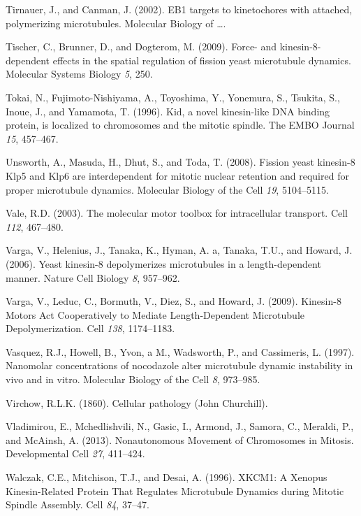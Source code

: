 \documentclass[12pt,a4paper,twoside,openright]{book}
\begin{document}
\hypertarget{ref-Tirnauer2002}{}
Tirnauer, J., and Canman, J. (2002). EB1 targets to kinetochores with
attached, polymerizing microtubules. Molecular Biology of \ldots{}.

\hypertarget{ref-Tischer2009}{}
Tischer, C., Brunner, D., and Dogterom, M. (2009). Force- and
kinesin-8-dependent effects in the spatial regulation of fission yeast
microtubule dynamics. Molecular Systems Biology \emph{5}, 250.

\hypertarget{ref-Tokai1996a}{}
Tokai, N., Fujimoto-Nishiyama, A., Toyoshima, Y., Yonemura, S., Tsukita,
S., Inoue, J., and Yamamota, T. (1996). Kid, a novel kinesin-like DNA
binding protein, is localized to chromosomes and the mitotic spindle.
The EMBO Journal \emph{15}, 457--467.

\hypertarget{ref-Unsworth2008}{}
Unsworth, A., Masuda, H., Dhut, S., and Toda, T. (2008). Fission yeast
kinesin-8 Klp5 and Klp6 are interdependent for mitotic nuclear retention
and required for proper microtubule dynamics. Molecular Biology of the
Cell \emph{19}, 5104--5115.

\hypertarget{ref-Vale2003}{}
Vale, R.D. (2003). The molecular motor toolbox for intracellular
transport. Cell \emph{112}, 467--480.

\hypertarget{ref-Varga2006}{}
Varga, V., Helenius, J., Tanaka, K., Hyman, A. a, Tanaka, T.U., and
Howard, J. (2006). Yeast kinesin-8 depolymerizes microtubules in a
length-dependent manner. Nature Cell Biology \emph{8}, 957--962.

\hypertarget{ref-Varga2009}{}
Varga, V., Leduc, C., Bormuth, V., Diez, S., and Howard, J. (2009).
Kinesin-8 Motors Act Cooperatively to Mediate Length-Dependent
Microtubule Depolymerization. Cell \emph{138}, 1174--1183.

\hypertarget{ref-Vasquez1997}{}
Vasquez, R.J., Howell, B., Yvon, a M., Wadsworth, P., and Cassimeris, L.
(1997). Nanomolar concentrations of nocodazole alter microtubule dynamic
instability in vivo and in vitro. Molecular Biology of the Cell
\emph{8}, 973--985.

\hypertarget{ref-virchow1860cellular}{}
Virchow, R.L.K. (1860). Cellular pathology (John Churchill).

\hypertarget{ref-Vladimirou2013}{}
Vladimirou, E., Mchedlishvili, N., Gasic, I., Armond, J., Samora, C.,
Meraldi, P., and McAinsh, A. (2013). Nonautonomous Movement of
Chromosomes in Mitosis. Developmental Cell \emph{27}, 411--424.

\hypertarget{ref-Walczak1996}{}
Walczak, C.E., Mitchison, T.J., and Desai, A. (1996). XKCM1: A Xenopus
Kinesin-Related Protein That Regulates Microtubule Dynamics during
Mitotic Spindle Assembly. Cell \emph{84}, 37--47.
\end{document}
